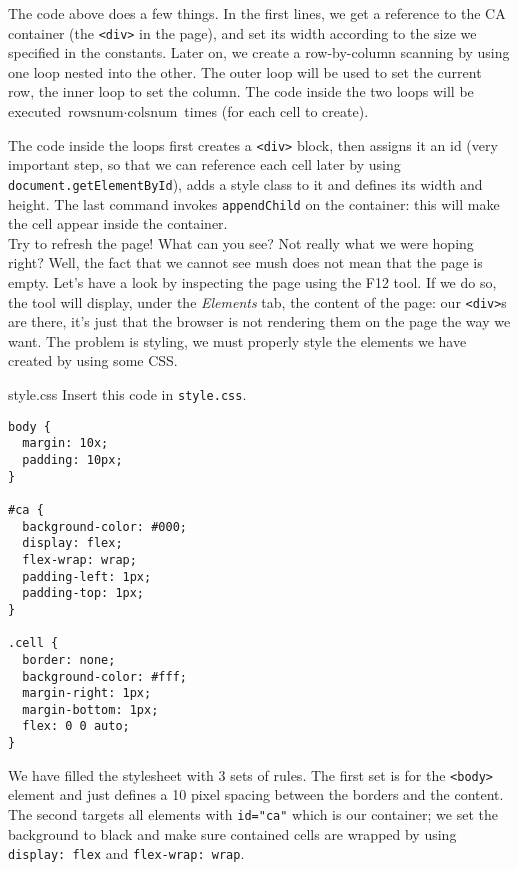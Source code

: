 The code above does a few things. In the first lines, we get a reference to the CA container
(the \texttt{<div>} in the page), and set its width according to the size we specified in the
constants. Later on, we create a row-by-column scanning by using one loop nested into the other.
The outer loop will be used to set the current row, the inner loop to set the column. The code
inside the two loops will be executed $\text{rowsnum} \cdot \text{colsnum}$ times
(for each cell to create).

The code inside the loops first creates a \texttt{<div>} block, then assigns it an id (very
important step, so that we can reference each cell later
by using \texttt{document.getElementById}), adds a style class to it and defines its width and height.
The last command invokes \texttt{appendChild} on the container: this will make the cell appear
inside the container.\\

Try to refresh the page! What can you see? Not really what we were hoping right? Well, the fact that
we cannot see mush does not mean that the page is empty. Let's have a look by inspecting the page
using the F12 tool. If we do so, the tool will display, under the \textit{Elements} tab, the
content of the page: our \texttt{<div>}s are there, it's just that the browser is not rendering
them on the page the way we want. The problem is styling, we must properly style the elements we
have created by using some CSS.

\begin{programcode}{style.css}
Insert this code in \texttt{style.css}.
\begin{verbatim}
body {
  margin: 10x;
  padding: 10px;
}

#ca {
  background-color: #000;
  display: flex;
  flex-wrap: wrap;
  padding-left: 1px;
  padding-top: 1px;
}

.cell {
  border: none;
  background-color: #fff;
  margin-right: 1px;
  margin-bottom: 1px;
  flex: 0 0 auto;
}
\end{verbatim}
\end{programcode}

We have filled the stylesheet with 3 sets of rules. The first set is for the \texttt{<body>} element
and just defines a 10 pixel spacing between the borders and the content. The second targets
all elements with \texttt{id="ca"} which is our container; we set the background to black and
make sure contained cells are wrapped by using \texttt{display: flex} and \texttt{flex-wrap: wrap}.

